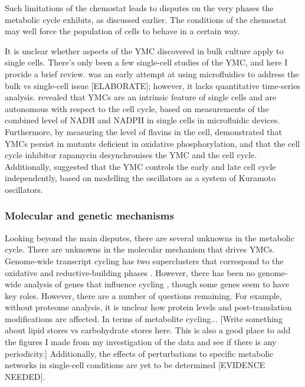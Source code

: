 Such limitations of the chemostat leads to disputes on the very phases the metabolic cycle exhibits, as discussed earlier.
The conditions of the chemostat may well force the population of cells to behave in a certain way.

It is unclear whether aspects of the YMC discovered in bulk culture apply to single cells.
There's only been a few single-cell studies of the YMC, and here I provide a brief review.
\citet{laxmanBehaviorMetabolicCycling2010} was an early attempt at using microfluidics to address the bulk vs single-cell issue [ELABORATE];
however, it lacks quantitative time-series analysis.
\citet{papagiannakisAutonomousMetabolicOscillations2017} revealed that YMCs are an intrinsic feature of single cells and are autonomous with respect to the cell cycle, based on measurements of the combined level of NADH and NADPH in single cells in microfluidic devices.
Furthermore, by measuring the level of flavins in the cell, \citet{baumgartnerFlavinbasedMetabolicCycles2018} demonstrated that YMCs persist in mutants deficient in oxidative phosphorylation, and that the cell cycle inhibitor rapamycin desynchronises the YMC and the cell cycle.
Additionally, \citet{ozsezenInferenceHighLevelInteraction2019} suggested that the YMC controls the early and late cell cycle independently, based on modelling the oscillators as a system of Kuramoto oscillators.

\subsubsection{Molecular and genetic mechanisms}
\label{subsubsec:intro-ymc-unresolved-molecular}
Looking beyond the main disputes, there are several unknowns in the metabolic cycle.
There are unknowns in the molecular mechanism that drives YMCs.
Genome-wide transcript cycling has two superclusters that correspond to the oxidative and reductive-building phases \citep{machneYinYangYeast2012}.
However, there has been no genome-wide analysis of genes that influence cycling \citep{mellorMolecularBasisMetabolic2016}, though some genes seem to have key roles.
However, there are a number of questions remaining.
For example, without proteome analysis, it is unclear how protein levels and post-translation modifications are affected.
In terms of metabolite cycling...
[Write something about lipid stores \citep{campbellBuildingBlocksAre2020} vs carbohydrate stores \citep{ewaldYeastCyclinDependentKinase2016} here.  This is also a good place to add the figures I made from my investigation of the \citet{campbellBuildingBlocksAre2020} data and see if there is any periodicity.]
Additionally, the effects of perturbations to specific metabolic networks in single-cell conditions are yet to be determined [EVIDENCE NEEDED].

